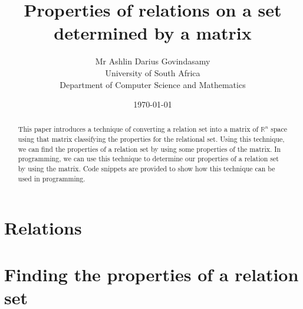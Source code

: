 \documentclass{report}
\title{Properties of relations on a set determined by a matrix}
\author{Mr Ashlin Darius Govindasamy\\ \large{University of South Africa} \\ \large{Department of Computer Science and Mathematics}}
\date{\today}
\begin{document}
\maketitle
\newpage

\begin{abstract}
This paper introduces a technique of converting a relation set into a matrix of $\mathbb{R}^{n}$ space using that matrix classifying the properties for the relational set.
Using this technique, we can find the properties of a relation set by using some properties of the matrix. In programming, we can use this technique to determine our properties of a relation set by using the matrix. Code snippets are provided to show how this technique can be used in programming.
\end{abstract}

\newpage
\tableofcontents



\chapter{Relations}


\chapter{Finding the properties of a relation set}

\newpage
\end{document}

